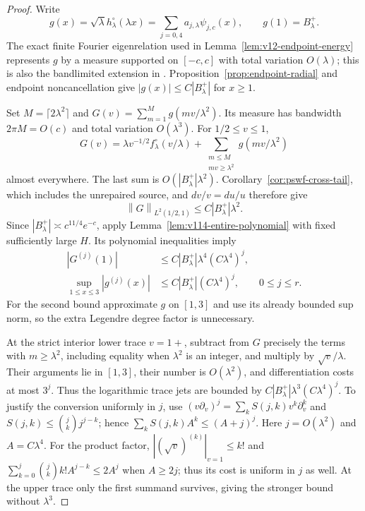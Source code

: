 \documentclass[11pt]{article}
\theoremstyle{remark}
\newcommand{\norm}[1]{\left\lVert #1\right\rVert}
\begin{document}
\begin{proof}
Write
\[
 g(x)=\sqrt\lambda h_\lambda^\circ(\lambda x)
     =\sum_{j=0,4}a_{j,\lambda}\psi_{j,c}(x),\qquad g(1)=B_\lambda^+.
\]
The exact finite Fourier eigenrelation used in
Lemma~\ref{lem:v12-endpoint-energy} represents $g$ by a measure supported
on $[-c,c]$ with total variation $O(\lambda)$; this is also the
bandlimited extension in \cite[\S30.15]{DLMFPSWF}.
Proposition~\ref{prop:endpoint-radial} and endpoint noncancellation give
$|g(x)|\le C|B_\lambda^+|$ for $x\ge1$.

Set $M=\lceil2\lambda^2\rceil$ and
$G(v)=\sum_{m=1}^M g(mv/\lambda^2)$. Its measure has bandwidth
$2\pi M=O(c)$ and total variation $O(\lambda^3)$. For $1/2\le v\le1$,
\[
 G(v)=\lambda v^{-1/2}f_\lambda^\circ(v/\lambda)
       +\sum_{\substack{m\le M\\mv\ge\lambda^2}}
                       g(mv/\lambda^2)
\]
almost everywhere. The last sum is $O(|B_\lambda^+|\lambda^2)$.
Corollary~\ref{cor:pswf-cross-tail}, which includes the unrepaired source,
and $dv/v=du/u$ therefore give
\[
 \norm G_{L^2(1/2,1)}\le C|B_\lambda^+|\lambda^2.
\]
Since $|B_\lambda^+|\asymp c^{11/4}e^{-c}$, apply
Lemma~\ref{lem:v114-entire-polynomial} with fixed sufficiently large $H$.
Its polynomial inequalities imply
\begin{align*}
 |G^{(j)}(1)|&\le C|B_\lambda^+|\lambda^4(C\lambda^4)^j,\\
 \sup_{1\le x\le3}|g^{(j)}(x)|
       &\le C|B_\lambda^+|(C\lambda^4)^j,
          \qquad 0\le j\le r.
\end{align*}
For the second bound approximate $g$ on $[1,3]$ and use its already
bounded sup norm, so the extra Legendre degree factor is unnecessary.

At the strict interior lower trace $v=1+$, subtract from $G$ precisely the
terms with $m\ge\lambda^2$, including equality when $\lambda^2$ is an
integer, and multiply by $\sqrt v/\lambda$. Their arguments lie in
$[1,3]$, their number is $O(\lambda^2)$, and differentiation costs at most
$3^j$. Thus the logarithmic trace jets are bounded by
$C|B_\lambda^+|\lambda^3(C\lambda^4)^j$.
To justify the conversion uniformly in $j$, use
$(v\partial_v)^j=\sum_k S(j,k)v^k\partial_v^k$ and
$S(j,k)\le\binom jk j^{j-k}$; hence
$\sum_k S(j,k)A^k\le(A+j)^j$. Here $j=O(\lambda^2)$ and
$A=C\lambda^4$. For the product factor, $|(\sqrt v)^{(k)}|_{v=1}\le k!$ and
$\sum_{k=0}^j\binom jk k!A^{j-k}\le2A^j$ when $A\ge2j$;
thus its cost is uniform in $j$ as well.
At the upper trace only the first summand survives, giving the stronger
bound without $\lambda^3$.


\end{proof}
\end{document}
